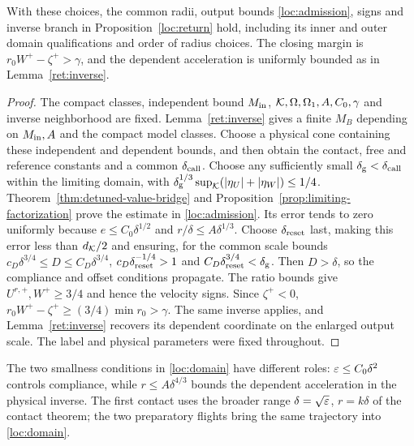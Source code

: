 \begin{theorem}
\label{thm:detuned-output-admission}
With these choices, the common radii, output bounds
\eqref{loc:admission}, signs and inverse branch in
Proposition~\ref{loc:return} hold, including its inner and outer
domain qualifications and order of radius choices. The closing
margin is $r_0W^+-\zeta^+>\gamma$, and the dependent acceleration
is uniformly bounded as in Lemma~\ref{ret:inverse}.
\end{theorem}
\begin{proof}
The compact classes, independent bound $M_{\rm in}$,
$\mathcal K,\Omega,\Omega_1,A,C_0,\gamma$ and inverse neighborhood are fixed.
Lemma~\ref{ret:inverse} gives a finite $M_B$ depending on
$M_{\rm in},A$ and the compact model classes. Choose a physical cone
containing these independent and dependent bounds, and then obtain
the contact, free and reference constants and a common
$\delta_{\rm call}$. Choose any sufficiently small
$\delta_{\rm g}<\delta_{\rm call}$ within the limiting domain, with
$\delta_{\rm g}^{1/3}\sup_{\mathcal K}(|\eta_U|+|\eta_W|)\le1/4$.
Theorem~\ref{thm:detuned-value-bridge} and
Proposition~\ref{prop:limiting-factorization} prove the estimate in
\eqref{loc:admission}. Its error tends to zero uniformly because
$e\le C_0\delta^{1/2}$ and $r/\delta\le A\delta^{1/3}$.
Choose $\delta_{\rm reset}$ last, making this error less than
$d_\mathcal K/2$ and ensuring, for the common scale bounds
$c_D\delta^{3/4}\le D\le C_D\delta^{3/4}$,
$c_D\delta_{\rm reset}^{-1/4}>1$ and
$C_D\delta_{\rm reset}^{3/4}<\delta_{\rm g}$.
Then $D>\delta$, so the compliance and offset conditions propagate.
The ratio bounds give $U^{r,+},W^+\ge3/4$ and hence the velocity
signs. Since $\zeta^+<0$,
$r_0W^+-\zeta^+\ge(3/4)\min r_0>\gamma$.
The same inverse applies, and Lemma~\ref{ret:inverse} recovers its
dependent coordinate on the enlarged output scale. The label and
physical parameters were fixed throughout.
\end{proof}

The two smallness conditions in \eqref{loc:domain} have different
roles: $\varepsilon\le C_0\delta^2$ controls compliance, while
$r\le A\delta^{4/3}$ bounds the dependent acceleration in the
physical inverse. The first contact uses the broader range
$\delta=\sqrt{\varepsilon}$, $r=k\delta$ of the contact theorem; the two
preparatory flights bring the same trajectory into \eqref{loc:domain}.
